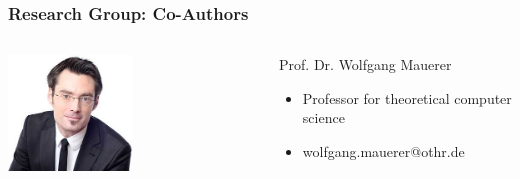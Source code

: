 \documentclass{beamer}
\begin{document}
	\begin{frame}
	\frametitle{Research Group: Co-Authors}
	\begin{minipage}[c]{1.0\linewidth}
		\begin{columns}
		\begin{column}{0.35\textwidth}
			\begin{center}
     		\includegraphics[width=0.5\textwidth]{pics/speakers_mauerer.jpeg}
			\end{center}
		\end{column}
		\begin{column}{0.7\textwidth}
		\begin{block}{Prof. Dr. Wolfgang Mauerer}
			\begin{itemize}
				\item Professor for theoretical computer science
				\item wolfgang.mauerer@othr.de
			\end{itemize}
		\end{block}
		\end{column}
		\end{columns}


\end{minipage}
\end{frame}
\end{document}
